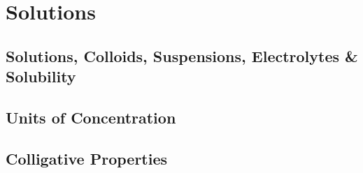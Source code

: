 \documentclass[../hchem.tex]{subfiles}
\begin{document}
\chapter{Solutions}
\section{Solutions, Colloids, Suspensions, Electrolytes \& Solubility}
\section{Units of Concentration}
\section{Colligative Properties}
\end{document}
